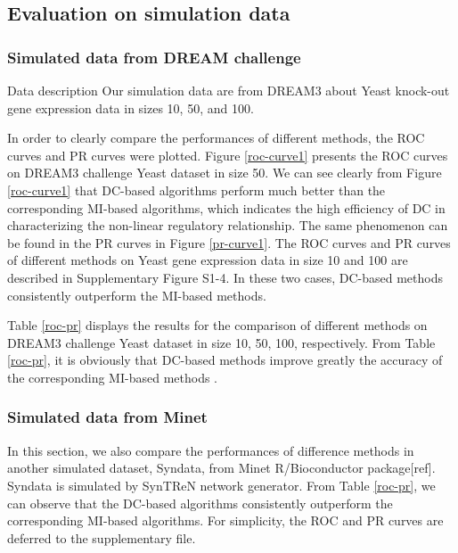 \documentclass{bioinfo}
\begin{document}
\subsection{Evaluation on simulation data}
\subsubsection{Simulated data from DREAM challenge}
{\color{red} Data description} Our simulation data are from DREAM3 about Yeast knock-out gene expression data in sizes
10, 50, and 100.

In order to clearly compare the performances of different methods, the ROC curves and PR curves were plotted.  Figure \ref{roc-curve1} presents the ROC curves on DREAM3 challenge Yeast dataset in size 50. We can see clearly from Figure \ref{roc-curve1} that DC-based algorithms perform much better than the corresponding MI-based algorithms, which indicates the high efficiency of DC in characterizing the non-linear regulatory relationship.
The same phenomenon can be found in the PR curves in Figure \ref{pr-curve1}. The ROC curves and PR curves of different methods on Yeast gene expression data in size 10 and 100 are described in Supplementary Figure S1-4. In these two cases, DC-based methods consistently outperform  the MI-based methods.

Table \ref{roc-pr} displays the results for the comparison of different methods on DREAM3 challenge Yeast dataset in size 10, 50, 100, respectively. From Table \ref{roc-pr}, it is obviously that DC-based methods improve greatly the accuracy of the corresponding MI-based methods .

\subsubsection{Simulated data from Minet} In this section, we also compare the performances of difference methods in another simulated dataset, Syndata, from Minet R/Bioconductor package[ref]. Syndata is simulated by SynTReN network generator. From Table \ref{roc-pr}, we can observe that the DC-based algorithms  consistently outperform the corresponding MI-based algorithms.  For simplicity, the ROC and PR curves are deferred to the supplementary file.
\end{document}

